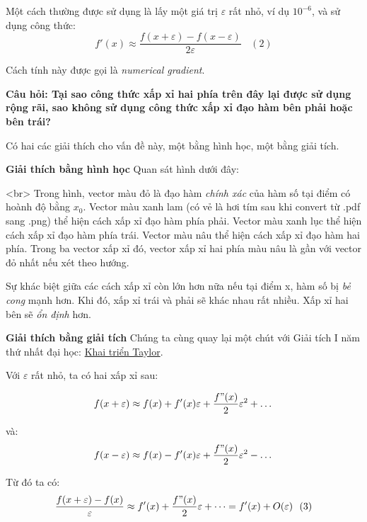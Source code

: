 Một cách thường được sử dụng là lấy một giá trị $\varepsilon $ rất nhỏ, ví dụ $10^{-6}$, và sử dụng công thức: 
\begin{equation*} 
f'(x) \approx \frac{f(x + \varepsilon) - f(x - \varepsilon)}{2\varepsilon} ~~~~ (2) 
\end{equation*} 
 
Cách tính này được gọi là \textit{numerical gradient}. 
 
\textbf{Câu hỏi: Tại sao công thức xấp xỉ hai phía trên đây lại được sử dụng rộng rãi, sao không sử dụng công thức xấp xỉ đạo hàm bên phải hoặc bên trái?} 
 
Có hai các giải thích cho vấn đề này, một bằng hình học, một bằng giải tích.  
 
 
\textbf{Giải thích bằng hình học }
Quan sát hình dưới đây: 
 
<br> 
Trong hình, vector màu đỏ là đạo hàm \textit{chính xác} của hàm số tại điểm có hoành độ bằng $x_0$. Vector màu xanh lam (có vẻ là hơi tím sau khi convert từ .pdf sang .png) thể hiện cách xấp xỉ đạo hàm phía phải. Vector màu xanh lục thể hiện cách xấp xỉ đạo hàm phía trái. Vector màu nâu thể hiện cách xấp xỉ đạo hàm hai phía. Trong ba vector xấp xỉ đó, vector xấp xỉ hai phía màu nâu là gần với vector đỏ nhất nếu xét theo hướng.  
 
Sự khác biệt giữa các cách xấp xỉ còn lớn hơn nữa nếu tại điểm x, hàm số bị \textit{bẻ cong} mạnh hơn. Khi đó, xấp xỉ trái và phải sẽ khác nhau rất nhiều. Xấp xỉ hai bên sẽ \textit{ổn định} hơn. 
 
 
\textbf{Giải thích bằng giải tích}
Chúng ta cùng quay lại một chút với Giải tích I năm thứ nhất đại học: \href{http://mathworld.wolfram.com/TaylorSeries.html}{Khai triển Taylor}.  
 
Với $\varepsilon$ rất nhỏ, ta có hai xấp xỉ sau:  
 
\begin{equation*} 
f(x + \varepsilon) \approx f(x) + f'(x)\varepsilon + \frac{f"(x)}{2} \varepsilon^2 + \dots 
\end{equation*} 
 
và: 
\begin{equation*} 
f(x - \varepsilon) \approx f(x) - f'(x)\varepsilon + \frac{f"(x)}{2} \varepsilon^2 - \dots 
\end{equation*} 
 
Từ đó ta có:  
\begin{equation*} 
\frac{f(x + \varepsilon) - f(x)}{\varepsilon} \approx f'(x) + \frac{f"(x)}{2}\varepsilon + \dots =  f'(x) + O(\varepsilon) ~~ (3) 
\end{equation*} 
 

